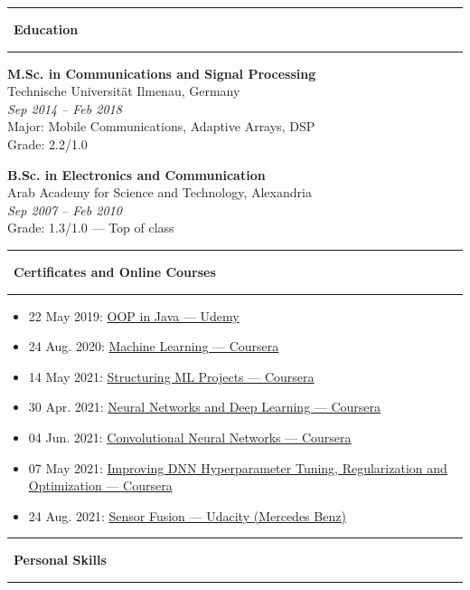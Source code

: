 \documentclass[10pt,a4paper]{article}
\newcommand{\sectionline}[1]{%
  \vspace{0.5em}
  \begin{center}
    \textcolor{title_color}{\rule[0.5ex]{0.25\linewidth}{0.5pt}}
    ~{\LARGE \bfseries \textcolor{title_color}{\cambria #1}}~
    \textcolor{title_color}{\rule[0.5ex]{0.25\linewidth}{0.5pt}}
  \end{center}
  \vspace{0.05em}
}
\begin{document}
\sectionline{Education}
\textbf{M.Sc. in Communications and Signal Processing}\\
Technische Universität Ilmenau, Germany\\
\textit{Sep 2014 -- Feb 2018}\\
Major: Mobile Communications, Adaptive Arrays, DSP\\
Grade: 2.2/1.0

\vspace{0.6em}
\textbf{B.Sc. in Electronics and Communication}\\
Arab Academy for Science and Technology, Alexandria\\
\textit{Sep 2007 -- Feb 2010}\\
Grade: 1.3/1.0 — Top of class

\sectionline{Certificates and Online Courses}
\begin{itemize}[leftmargin=*]
  \item 22 May 2019: \href{https://www.udemy.com/certificate/UC-XN2ILPOB/}{OOP in Java — Udemy}
  \item 24 Aug. 2020: \href{https://coursera.org/share/e32b80d8e0b32b48e4ad6fe40cea746e}{Machine Learning — Coursera}
  \item 14 May 2021: \href{https://coursera.org/share/15d74342746d2872a09dcc5a75ff460c}{Structuring ML Projects — Coursera}
  \item 30 Apr. 2021: \href{https://coursera.org/share/0ca157f56b99f56122ab247589555837}{Neural Networks and Deep Learning — Coursera}
  \item 04 Jun. 2021: \href{https://coursera.org/share/e0bd7b6ea301e1108dfe609c783f2706}{Convolutional Neural Networks — Coursera}
  \item 07 May 2021: \href{https://coursera.org/share/ef6671ff524b9d2e5c1e0e282d457f56}{Improving DNN Hyperparameter Tuning, Regularization and Optimization — Coursera}
  \item 24 Aug. 2021: \href{http://www.udacity.com/certificate/e/95ce8498-c21f-11eb-aa1a-5f098308d726}{Sensor Fusion — Udacity (Mercedes Benz)}
\end{itemize}


\vspace{2em}
\sectionline{Personal Skills}
\end{document}

